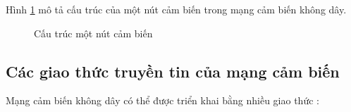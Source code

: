 \documentclass{hust}
\begin{document}
Hình \ref{fig:wsn-nodes} mô tả cấu trúc của một nút cảm biến trong mạng cảm biến không dây.


\begin{figure}[htb]
	\caption{Cấu trúc một nút cảm biến}\label{fig:wsn-nodes}
\end{figure}

\subsection{Các giao thức truyền tin của mạng cảm biến}
Mạng cảm biến không dây có thể được triển khai bằng nhiều giao thức \cite{akkaya2005survey}:
\end{document}
